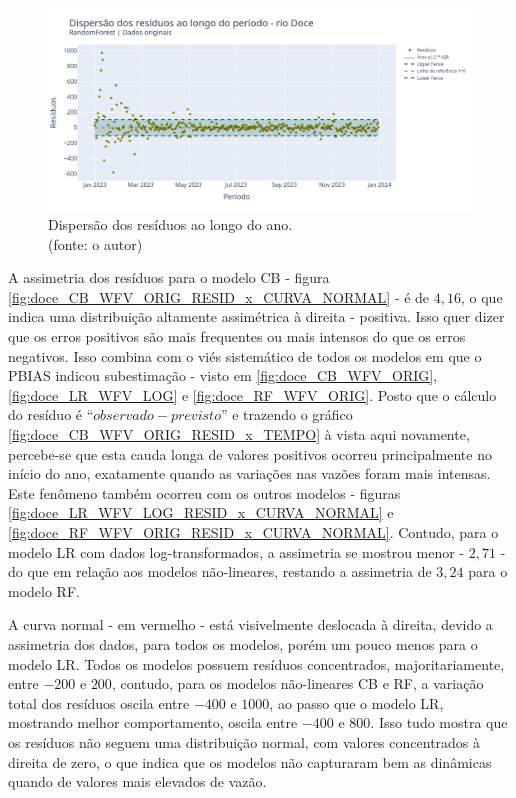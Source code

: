 \begin{figure}[!h]
\centering
\includegraphics[scale=0.33]{Figuras/rio_doce/wfv/RF/RF_WFV_ORIG_RESID_x_TEMPO.png}
\caption{Dispersão dos resíduos ao longo do ano.\\(fonte: o autor)}
\label{fig:doce_RF_WFV_ORIG_RESID_x_TEMPO}
\end{figure}
\clearpage

A assimetria dos resíduos para o modelo CB - figura \ref{fig:doce_CB_WFV_ORIG_RESID_x_CURVA_NORMAL} - é de $4,16$, o que indica uma distribuição altamente assimétrica à direita - positiva. Isso quer dizer que os erros positivos são mais frequentes ou mais intensos do que os erros negativos. Isso combina com o viés sistemático de todos os modelos em que o PBIAS indicou subestimação - visto em \ref{fig:doce_CB_WFV_ORIG}, \ref{fig:doce_LR_WFV_LOG} e \ref{fig:doce_RF_WFV_ORIG}. Posto que o cálculo do resíduo é ``$observado - previsto$'' e trazendo o gráfico \ref{fig:doce_CB_WFV_ORIG_RESID_x_TEMPO} à vista aqui novamente, percebe-se que esta cauda longa de valores positivos ocorreu principalmente no início do ano, exatamente quando as variações nas vazões foram mais intensas. Este fenômeno também ocorreu com os outros modelos - figuras \ref{fig:doce_LR_WFV_LOG_RESID_x_CURVA_NORMAL} e \ref{fig:doce_RF_WFV_ORIG_RESID_x_CURVA_NORMAL}. Contudo, para o modelo LR com dados log-transformados, a assimetria se mostrou menor - $2,71$ - do que em relação aos modelos não-lineares, restando a assimetria de $3,24$ para o modelo RF.
 
A curva normal - em vermelho - está visivelmente deslocada à direita, devido a assimetria dos dados, para todos os modelos, porém um pouco menos para o modelo LR. Todos os modelos possuem resíduos concentrados, majoritariamente, entre $-200$ e $200$, contudo, para os modelos não-lineares CB e RF, a variação total dos resíduos oscila entre $-400$ e $1000$, ao passo que o modelo LR, mostrando melhor comportamento, oscila entre $-400$ e $800$. Isso tudo mostra que os resíduos não seguem uma distribuição normal, com valores concentrados à direita de zero, o que indica que os modelos não capturaram bem as dinâmicas quando de valores mais elevados de vazão.

